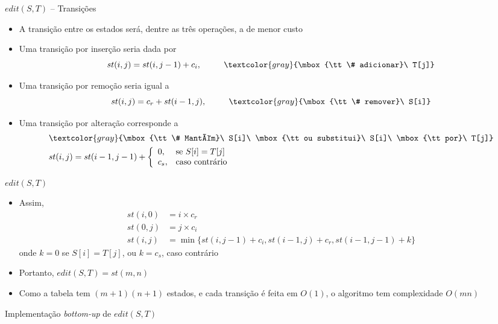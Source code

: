 \begin{frame}[fragile]{$edit(S, T)$ -- Transições}

    \begin{itemize}
        \item A transição entre os estados será, dentre as três operações, a de menor custo
        \pause

        \item Uma transição por inserção seria dada por
        \[
            st(i, j) = st(i, j - 1) + c_i,\ \ \ \ \ \ \ \ \textcolor{gray}{\mbox{\tt \# adicionar}\ T[j]}
        \]
        \pause

        \item Uma transição por remoção seria igual a
        \[
            st(i, j) = c_r + st(i - 1, j),\ \ \ \ \ \ \ \ \textcolor{gray}{\mbox{\tt \# remover}\ S[i]}
        \]
        \pause

        \item Uma transição por alteração corresponde a
        \begin{align*}
            &\textcolor{gray}{\mbox{\tt \# Mantém}\ S[i]\ \mbox{\tt ou substitui}\ S[i]\ \mbox{\tt por}\ T[j]} \\
            &st(i, j) = st(i - 1, j - 1) + \left\lbrace\begin{array}{ll}0, & \mbox{se}\ S[i] = T[j] \\ c_s,& \mbox{caso contrário}\end{array}\right.   
        \end{align*}
    \end{itemize}

\end{frame}

\begin{frame}[fragile]{$edit(S, T)$}

    \begin{itemize}
        \item Assim,
        \begin{align*}
            st(i, 0) &= i \times c_r \\
            st(0, j) &= j \times c_i \\
            st(i, j) &= \min\lbrace st(i, j - 1) + c_i, st(i - 1, j) + c_r, st(i - 1, j - 1) + k \rbrace
        \end{align*}
        onde $k = 0$ se $S[i] = T[j]$, ou $k = c_s$, caso contrário
        \pause

        \item Portanto, $edit(S, T) = st(m, n)$
        \pause

        \item Como a tabela tem $(m + 1)(n + 1)$ estados, e cada transição é feita em $O(1)$, o algoritmo tem 
            complexidade $O(mn)$
    \end{itemize}

\end{frame}



\begin{frame}[fragile]{Implementação {\it bottom-up} de $edit(S, T)$}
\end{frame}

